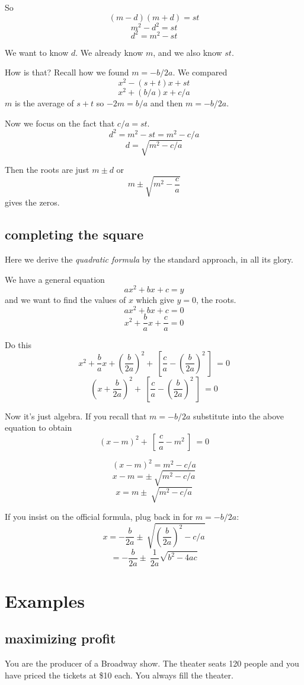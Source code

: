 \documentclass[11pt, oneside]{article}
\begin{document}
So 
\[ (m - d)(m + d) = st \]
\[ m^2 - d^2 = st \]
\[ d^2 = m^2 - st \]

We want to know $d$.  We already know $m$, and we also know $st$.  

How is that?  Recall how we found $m = -b/2a$.  We compared
\[ x^2 - (s + t) x + st \]
\[ x^2 + (b/a) x + c/a \]
$m$ is the average of $s + t$ so $-2m = b/a$ and then $m = -b/2a$.

Now we focus on the fact that $c/a = st$.
\[ d^2 = m^2 - st = m^2 - c/a \]
\[ d = \sqrt{m^2 - c/a} \]

Then the roots are just $m \pm d$ or
\[ m \pm \sqrt{m^2 - \frac{c}{a}} \]
gives the zeros.

\subsection*{completing the square}
Here we derive the \emph{quadratic formula} by the standard approach, in all its glory.

We have a general equation
\[ ax^2 + bx + c = y \]
and we want to find the values of $x$ which give $y = 0$, the roots.
\[ ax^2 + bx + c = 0 \]
\[ x^2 + \frac{b}{a} x + \frac{c}{a} = 0 \]

Do this
\[ x^2 + \frac{b}{a}x + (\frac{b}{2a})^2 + \ [ \frac{c}{a} - (\frac{b}{2a})^2 \ ] \ = 0 \]
\[ (x + \frac{b}{2a})^2 + \ [ \frac{c}{a} - (\frac{b}{2a})^2 \ ] \ = 0 \]

Now it's just algebra.  If you recall that $m = -b/2a$ substitute into the above equation to obtain
\[ (x - m)^2 + \ [ \ \frac{c}{a} - m^2 \ ] \ = 0 \]

\[ (x - m)^2 = m^2 - c/a \]
\[ x - m = \pm \ \sqrt{m^2 - c/a} \]
\[ x = m \pm \ \sqrt{m^2 - c/a} \]

If you insist on the official formula, plug back in for $m = -b/2a$:
\[ x = -\frac{b}{2a} \pm \ \sqrt{(\frac{b}{2a})^2 - c/a} \]
\[ = -\frac{b}{2a} \pm \ \frac{1}{2a} \sqrt{b^2 - 4ac} \]

\section*{Examples}

\subsection*{maximizing profit}
You are the producer of a Broadway show.  The theater seats 120 people and you have priced the tickets at \$10 each.  You always fill the theater.
\end{document}
